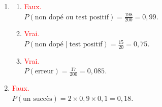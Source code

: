 \documentclass[11pt,a4paper]{article}
\newcommand{\reponse}[1]{\textcolor{red}{#1}}
\begin{document}
\begin{enumerate}
    \item
    \begin{enumerate}
        \item \reponse{Faux.} \\
        \textit{$P(\text{non dopé ou test positif}) = \frac{198}{200} = 0,99$.}

        \item \reponse{Vrai.} \\
        \textit{$P(\text{non dopé} \mid \text{test positif}) = \frac{15}{20} = 0,75$.}

        \item \reponse{Vrai.} \\
        \textit{$P(\text{erreur}) = \frac{17}{200} = 0,085$.}
    \end{enumerate}

    \item \reponse{Faux.} \\
    \textit{$P(\text{un succès}) = 2 \times 0,9 \times 0,1 = 0,18$.}
\end{enumerate}
\end{document}
